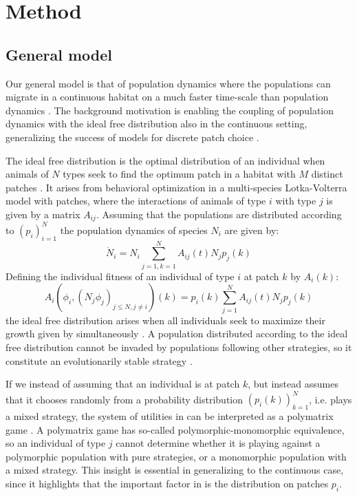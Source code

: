 \section{Method}


\subsection*{General model}

Our general model is that of population dynamics where the populations can migrate in a continuous habitat on a much faster time-scale than population dynamics \citep{cressman2006migration}. The background motivation is enabling the coupling of population dynamics with the ideal free distribution also in the continuous setting, generalizing the success of models for discrete patch choice \citep{valdovinos2010consequences}.

The ideal free distribution is the optimal distribution of an individual when animals of $N$ types seek to find the optimum patch in a habitat with $M$ distinct patches \citep{kvrivan2008ideal}. It arises from behavioral optimization in a multi-species Lotka-Volterra model with patches, where the interactions of animals of type $i$ with type $j$ is given by a matrix $A_{ij}$. Assuming that the populations are distributed according to $(p_i)_{i=1}^N$ the population dynamics of species $N_i$ are given by:
\begin{equation}
  \dot{N}_i = N_i\sum_{j=1,k=1}^N {A_{ij}(t)N_j p_j}(k) %
  \label{eq:utility_pm}
\end{equation}
Defining the individual fitness of an individual of type $i$ at patch $k$ by $A_i(k)$:
\begin{equation}
  A_i(\phi_i, (N_j \phi_j)_{j \leq N, j \neq i})(k) = p_i(k) \sum_{j=1}^N {A_{ij}(t)N_j p_j}(k) %
  \label{eq:utility_pm}
\end{equation}
the ideal free distribution arises when all individuals seek to maximize their growth given by  simultaneously \citep{cressman2004ideal}. A population distributed according to the ideal free distribution cannot be invaded by populations following other strategies, so it constitute an evolutionarily stable strategy \citep{cressman2010ideal}.



If we instead of assuming that an individual is at patch $k$, but instead assumes that it chooses randomly from a probability distribution $(p_i(k))_{k=1}^N$, i.e. plays a mixed strategy, the system of utilities in  can be interpreted as a polymatrix game \citep{howson1972equilibria}. A polymatrix game has so-called polymorphic-monomorphic equivalence, so an individual of type $j$ cannot determine whether it is playing against a polymorphic population with pure strategies, or a monomorphic population with a mixed strategy. This insight is essential in generalizing to the continuous case, since it highlights that the important factor in  is the distribution on patches $p_i$.

